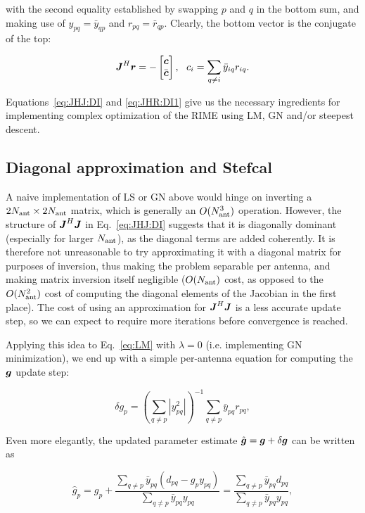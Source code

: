 \documentclass[useAMS,usenatbib]{mn2e}
\newcommand{\mat}[1]{{\bmath{#1}}}
\newcommand{\JJ}{\mat{J}} %
\newcommand{\JHJ}{\JJ^H\JJ} %
\begin{document}
with the second equality established by swapping $p$ and $q$ in the bottom sum, and making use of $y_{pq}=\bar{y}_{qp}$ and $r_{pq}=\bar{r}_{qp}$. Clearly, the bottom vector is the conjugate of the top:

\begin{equation}
\label{eq:JHR:DI1}
\JJ^H\bmath{r} = -\Matrix{c}{\bmath{c}\\\bar{\bmath{c}}},~~c_i = \sum\limits_{q\ne i} \bar{y}_{iq} r_{iq}.
\end{equation}

Equations~\ref{eq:JHJ:DI} and \ref{eq:JHR:DI1} give us the necessary ingredients for implementing complex
optimization of the RIME using LM, GN and/or steepest descent. 

\subsection{Diagonal approximation and Stefcal}
\label{sec:DI:stefcal}

A naive implementation of LS or GN above would hinge on inverting a $2N_\mathrm{ant}\times2N_\mathrm{ant}$ matrix, which is generally 
an $O(N_\mathrm{ant}^3)$ operation. However, the structure of $\JJ^H\JJ$ in Eq.~\ref{eq:JHJ:DI} suggests that it is diagonally 
dominant (especially for larger $N_\mathrm{ant}$), as the diagonal terms are added coherently. It is therefore not unreasonable 
to try approximating it with a diagonal matrix for purposes of inversion, thus making the problem separable per antenna,
and making matrix inversion itself negligible ($O(N_\mathrm{ant})$ cost, as opposed to the $O(N_\mathrm{ant}^2)$ cost of computing the 
diagonal elements of the Jacobian in the first place). The cost of using an approximation for $\JHJ$ is a less accurate
update step, so we can expect to require more iterations before convergence is reached.

Applying this idea to Eq.~\ref{eq:LM} with $\lambda=0$ (i.e. implementing GN minimization), we end up with a 
simple per-antenna equation for computing the $\bmath{g}$ update step:

\begin{equation}
\label{eq:update:di:unpol}
\delta g_p = \left( \sum\limits_{q\ne p} |y^2_{pq}|  \right )^{-1} \sum\limits_{q\ne p} \bar{y}_{pq} r_{pq},
\end{equation}

Even more elegantly, the updated parameter estimate $\hat{\bmath{g}} = \bmath{g}+\delta \bmath{g}$ can be written as

\begin{equation}
\label{eq:stefcal}
\hat{g}_p = g_p + \frac{\sum\limits_{q\ne p} \bar{y}_{pq} (d_{pq} - g_p y_{pq})}{\sum\limits_{q\ne p} \bar{y}_{pq} y_{pq}} 
= \frac{\sum\limits_{q\ne p} \bar{y}_{pq} d_{pq} }{\sum\limits_{q\ne p} \bar{y}_{pq} y_{pq}},
\end{equation}
\end{document}

